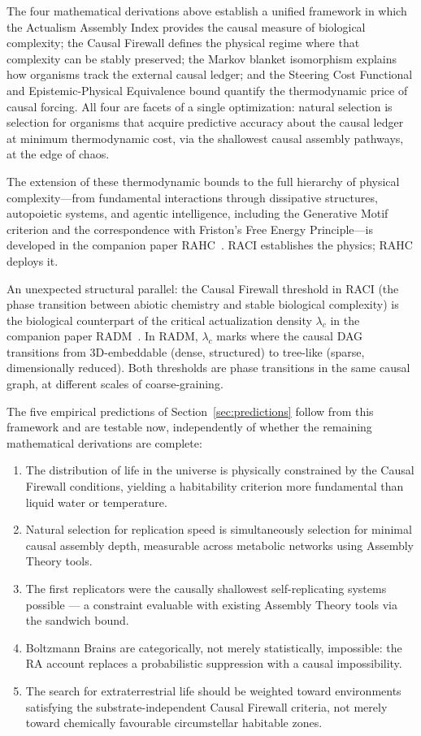 \documentclass[11pt,a4paper]{article}
\theoremstyle{plain}
\theoremstyle{definition}
\theoremstyle{remark}
\begin{document}
The four mathematical derivations above establish a unified framework in which the
Actualism Assembly Index provides the causal measure of biological complexity; the
Causal Firewall defines the physical regime where that complexity can be stably
preserved; the Markov blanket isomorphism explains how organisms track the external
causal ledger; and the Steering Cost Functional and Epistemic-Physical Equivalence
bound quantify the thermodynamic price of causal forcing. All four are facets of a
single optimization: natural selection is selection for organisms that acquire
predictive accuracy about the causal ledger at minimum thermodynamic cost, via the
shallowest causal assembly pathways, at the edge of chaos.

The extension of these thermodynamic bounds to the full hierarchy of physical
complexity---from fundamental interactions through dissipative structures,
autopoietic systems, and agentic intelligence, including the Generative Motif
criterion and the correspondence with Friston's Free Energy Principle---is
developed in the companion paper RAHC~\citep{Sandeman2026RAHC}. RACI establishes
the physics; RAHC deploys it.

An unexpected structural parallel: the Causal Firewall threshold in RACI (the
phase transition between abiotic chemistry and stable biological complexity) is
the biological counterpart of the critical actualization density $\lambda_c$ in
the companion paper RADM~\citep{Sandeman2026RADM}. In RADM, $\lambda_c$ marks
where the causal DAG transitions from 3D-embeddable (dense, structured) to
tree-like (sparse, dimensionally reduced). Both thresholds are phase transitions
in the same causal graph, at different scales of coarse-graining.

The five empirical predictions of Section~\ref{sec:predictions} follow from this
framework and are testable now, independently of whether the remaining mathematical
derivations are complete:

\begin{enumerate}[leftmargin=*]
  \item The distribution of life in the universe is physically constrained by the
  Causal Firewall conditions, yielding a habitability criterion more fundamental
  than liquid water or temperature.
  \item Natural selection for replication speed is simultaneously selection for
  minimal causal assembly depth, measurable across metabolic networks using
  Assembly Theory tools.
  \item The first replicators were the causally shallowest self-replicating systems
  possible --- a constraint evaluable with existing Assembly Theory tools via the
  sandwich bound.
  \item Boltzmann Brains are categorically, not merely statistically, impossible:
  the RA account replaces a probabilistic suppression with a causal impossibility.
  \item The search for extraterrestrial life should be weighted toward environments
  satisfying the substrate-independent Causal Firewall criteria, not merely toward
  chemically favourable circumstellar habitable zones.
\end{enumerate}
\end{document}
